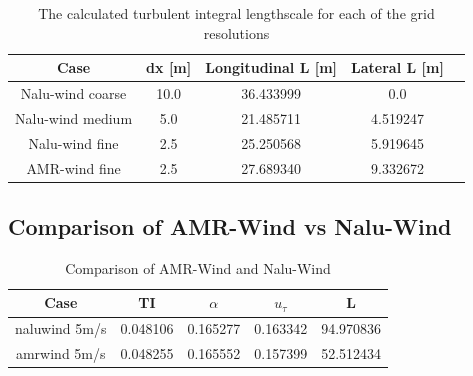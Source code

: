 \begin{table}
\caption{\label{tab:GridStudyLscale} The calculated turbulent integral
  lengthscale for each of the grid resolutions} \centering
\begin{tabular}{ccccc}
  \hline
  Case              & dx [m] & Longitudinal L [m] & Lateral L [m] \\
  \hline
  Nalu-wind coarse  &  10.0  & 36.433999          & 0.0        \\
  Nalu-wind medium  &   5.0  & 21.485711          & 4.519247   \\
  Nalu-wind fine    &   2.5  & 25.250568          & 5.919645   \\
  AMR-wind fine     &   2.5  & 27.689340          & 9.332672   \\
\hline
\end{tabular}
\end{table}

\subsection{Comparison of AMR-Wind vs Nalu-Wind}

\begin{table}
\caption{\label{tab:CompareAMRvsNalu} Comparison of AMR-Wind and Nalu-Wind} \centering
\begin{tabular}{ccccc}
  \hline
  Case          & TI        &  $\alpha$  &   $u_\tau$ &       L \\
  \hline
  naluwind 5m/s &  0.048106 &  0.165277 &  0.163342 & 94.970836 \\
  amrwind 5m/s  &  0.048255 &  0.165552 &  0.157399 & 52.512434 \\
  \hline
\end{tabular}
\end{table}


